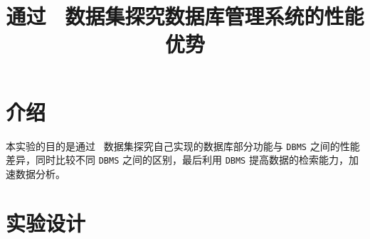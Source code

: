 %
%
%
\title{通过 \bilibili\ 数据集探究数据库管理系统的性能优势}

\maketitle\tableofcontents\clearpage

\section{介绍}
本实验的目的是通过 \bilibili\ 数据集探究自己实现的数据库部分功能与 \texttt{DBMS} 之间的性能差异，同时比较不同 \texttt{DBMS} 之间的区别，最后利用 \texttt{DBMS} 提高数据的检索能力，加速数据分析。



\section{实验设计}
